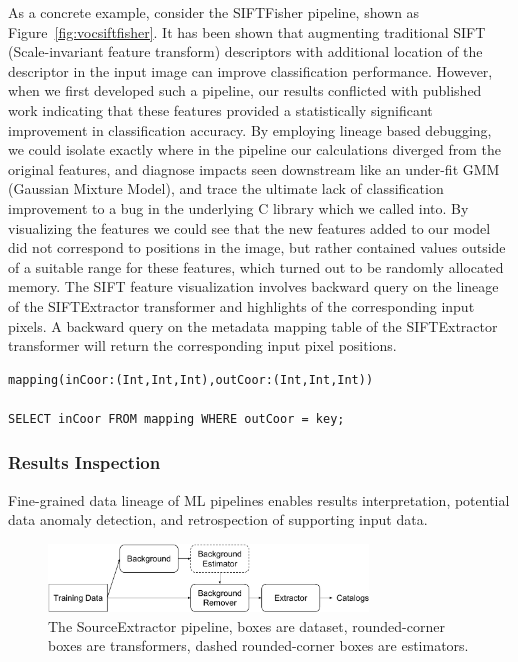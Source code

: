 \documentclass{sig-alternate}
\begin{document}
As a concrete example, consider the SIFTFisher pipeline, shown as Figure~\ref{fig:vocsiftfisher}. 
It has been shown that augmenting traditional SIFT~\cite{lowe99} (Scale-invariant feature transform) descriptors with additional location 
of the descriptor in the input image can improve classification performance.
However, when we first developed such a pipeline, our results conflicted with published work indicating that these features provided a statistically significant improvement in classification accuracy.
By employing lineage based debugging, we could isolate exactly where in the pipeline our calculations diverged from the original features, and diagnose impacts seen downstream like an under-fit GMM (Gaussian Mixture Model), and trace the ultimate lack of classification improvement to a bug in the underlying C library which we called into.
By visualizing the features we could see that the new features added to our model did not correspond to positions in the image, but rather contained values outside of a suitable range for these features, which turned out to be randomly allocated memory. The SIFT feature visualization involves backward query on the lineage of the SIFTExtractor transformer and highlights of the corresponding input pixels.
A backward query on the metadata mapping table of the SIFTExtractor transformer will return the corresponding input pixel positions.
\begin{lstlisting}
mapping(inCoor:(Int,Int,Int),outCoor:(Int,Int,Int))

SELECT inCoor FROM mapping WHERE outCoor = key;
\end{lstlisting}

\subsubsection{Results Inspection}
Fine-grained data lineage of ML pipelines enables results interpretation, potential data anomaly detection, 
and retrospection of supporting input data.

\begin{figure}[ht]
\begin{center}
    \includegraphics[width=85mm]{pictures/SourceExtractor}
    \caption {The SourceExtractor pipeline, boxes are dataset, rounded-corner boxes are transformers, dashed rounded-corner boxes are estimators.
    \label{fig:sourceextractor}
}
\end{center}
\end{figure}
\end{document}
